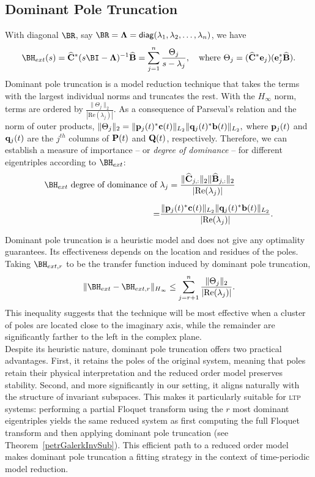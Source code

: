 \documentclass[pdflatex,sn-mathphys-num]{sn-jnl}%
\theoremstyle{thmstyleone}%
\theoremstyle{thmstyletwo}%
\theoremstyle{thmstylethree}%
\newcommand{\re}{\text{Re}}
\def\Bb{{\bf b}}  \def\BB{{\bf B}}
\def\Bc{{\bf c}}  \def\BC{{\bf C}}
\def\Be{{\bf e}}  \def\BE{{\bf E}}
\def\Bp{{\bf p}}  \def\BP{{\bf P}}
\def\Bq{{\bf q}}  \def\BQ{{\bf Q}}
\def\BLambda{{\boldsymbol{\Lambda}}}
\def\BLambda{{\boldsymbol{\Lambda}}}
\def\BLambda{{\boldsymbol{\Lambda}}}
\def\Bhat{\widehat{\mathbf{B}}}
\def\Chat{\widehat{\mathbf{C}}}
\begin{document}
\subsection{Dominant Pole Truncation}
\label{se:DPexpectations}
With diagonal $\BR$, say $\BR = \BLambda=\mathsf{diag}(\lambda_1,\lambda_2,\ldots,\lambda_n)$, we have
\begin{equation}
\label{eq:Hpoleres}
\BH_{ext}(s)=\widehat{\BC}^*(s\BI-\BLambda)^{-1}\widehat{\BB} =\sum_{j=1}^n \frac{\Theta_j}{s-\lambda_j}, \quad \text{where } \Theta_j=(\widehat{\BC}^*\Be_j)(\Be_j^*\widehat{\BB}).
\end{equation}
Dominant pole truncation is a model reduction technique that takes the terms with the largest individual norms and truncates the rest. With the $H_{\infty}$ norm, terms are ordered by $\frac{\|\Theta_j\|_{2}}{|\re(\lambda_j)|}$. As a consequence of Parseval's relation and the norm of outer products, $\|\Theta_j\|_2=\|\Bp_j(t)^*\Bc(t)\|_{L_2}\|\Bq_j(t)^*\Bb(t)\|_{L_2},$ where $\Bp_j(t)$ and $\Bq_j(t)$ are the $j^{th}$ columns of $\BP(t)$ and $\BQ(t)$, respectively. Therefore, we can establish a measure of importance -- or \emph{degree of dominance} -- for different eigentriples according to $\BH_{ext}$:  
\begin{equation}\label{eq:degdom}
\begin{aligned}
\BH_{ext}\text{ degree of dominance of }& \lambda_j = \frac{\|\Chat_{j,:}\|_{2}\|\Bhat_{j,:}\|_{2}}{|\re(\lambda_j)|}\\[2mm]
=&\frac{\|\Bp_j(t)^*\Bc(t)\|_{L_2}\|\Bq_j(t)^*\Bb(t)\|_{L_2}}{|\re(\lambda_j)|}.  
\end{aligned}
\end{equation}

Dominant pole truncation is a heuristic model and does not give any optimality guarantees. Its effectiveness depends on the location and residues of the poles. Taking $\BH_{ext,r}$ to be the transfer function induced by dominant pole truncation, 
\begin{equation}
    \|\BH_{ext}-\BH_{ext,r}\|_{H_\infty} \leq \sum_{j=r+1}^n\frac{\|\Theta_j\|_{2}}{|\re(\lambda_j)|}.
\end{equation}
This inequality suggests that the technique will be most effective when a cluster of poles are located close to the imaginary axis, while the remainder are significantly farther to the left in the complex plane.\\
Despite its heuristic nature, dominant pole truncation offers two practical advantages. First, it retains the poles of the original system, meaning that poles retain their physical interpretation and the reduced order model preserves stability.  Second, and more significantly in our setting, it aligns naturally with the structure of invariant subspaces. This makes it particularly suitable for \textsc{ltp} systems: performing a partial Floquet transform using the $r$ most dominant eigentriples yields the same reduced system as first computing the full Floquet transform and then applying dominant pole truncation (see Theorem~\ref{petrGalerkInvSub}). This efficient path to a reduced order model makes dominant pole truncation a fitting strategy in the context of time-periodic model reduction.
\end{document}
